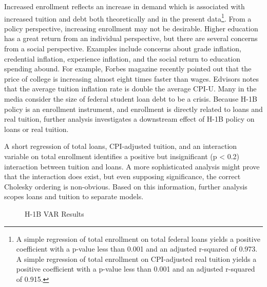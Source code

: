 \documentclass[review]{elsarticle}
\begin{document}
Increased enrollment reflects an increase in demand which is associated with
increased tuition and debt both theoretically and in the present data\footnote{
    A simple regression of total enrollment on total federal loans yields a
    positive coefficient with a p-value less than 0.001 and an adjusted r-squared
    of 0.973.
    A simple regression of total enrollment on CPI-adjusted real tuition yields a
    positive coefficient with a p-value less than 0.001 and an adjusted r-squared
    of 0.915.
}.
From a policy perspective, increasing enrollment may not be desirable.
Higher education has a great return from an individual perspective, but there are several concerns from a social perspective.
Examples include concerns about grade inflation, credential inflation, experience inflation,
and the social return to education spending abound.
For example, Forbes magazine recently pointed out that the price of college is increasing almost eight times faster than wages\cite{maldonado2018price}.
Edvisors notes that the average tuition inflation rate is double the average CPI-U\cite{edvisors_2019}.
Many in the media consider the size of federal student loan debt to be a crisis.
Because H-1B policy is an enrollment instrument,
and enrollment is directly related to loans and real tuition,
further analysis investigates a downstream effect of H-1B policy on loans or real tuition.

A short regression of total loans,
CPI-adjusted tuition,
and an interaction variable on total enrollment
identifies a positive but insignificant (p < 0.2)
interaction between tuition and loans.
A more sophisticated analysis might prove that the interaction does exist, but even supposing significance, the correct Cholesky ordering is non-obvious.
Based on this information, further analysis scopes loans and tuition to separate models.

\begin{figure}[h!]
    \centering
    \caption{H-1B VAR Results}
    \label{fig:var_results}
\end{figure}
\end{document}
